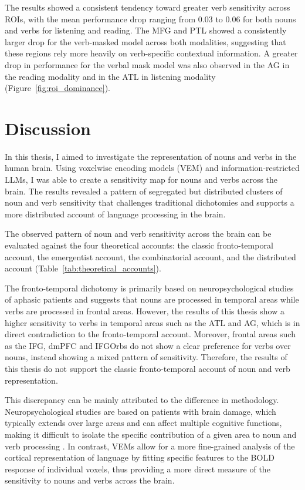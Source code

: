 \documentclass[a4paper]{article}
\begin{document}
The results showed a consistent tendency toward greater verb sensitivity across ROIs, with the mean performance drop ranging from 0.03 to 0.06 for both nouns and verbs for listening and reading. The MFG and PTL showed a consistently larger drop for the verb-masked model across both modalities, suggesting that these regions rely more heavily on verb-specific contextual information. A greater drop in performance for the verbal mask model was also observed in the AG in the reading modality and in the ATL in listening modality (Figure~\ref{fig:roi_dominance}).

\section*{Discussion} 
In this thesis, I aimed to investigate the representation of nouns and verbs in the human brain. Using voxelwise encoding models (VEM) and information-restricted LLMs, I was able to create a sensitivity map for nouns and verbs across the brain. The results revealed a pattern of segregated but distributed clusters of noun and verb sensitivity that challenges traditional dichotomies and supports a more distributed account of language processing in the brain.

The observed pattern of noun and verb sensitivity across the brain can be evaluated against the four theoretical accounts: the classic fronto-temporal account, the emergentist account, the combinatorial account, and the distributed account (Table~\ref{tab:theoretical_accounts}).

The fronto-temporal dichotomy is primarily based on neuropsychological studies of aphasic patients and suggests that nouns are processed in temporal areas while verbs are processed in frontal areas. However, the results of this thesis show a higher sensitivity to verbs in temporal areas such as the ATL and AG, which is in direct contradiction to the fronto-temporal account. Moreover, frontal areas such as the IFG, dmPFC and IFGOrbs do not show a clear preference for verbs over nouns, instead showing a mixed pattern of sensitivity. Therefore, the results of this thesis do not support the classic fronto-temporal account of noun and verb representation.

This discrepancy can be mainly attributed to the difference in methodology. Neuropsychological studies are based on patients with brain damage, which typically extends over large areas and can affect multiple cognitive functions, making it difficult to isolate the specific contribution of a given area to noun and verb processing \parencite{crepaldi_clustering_2013}. In contrast, VEMs allow for a more fine-grained analysis of the cortical representation of language by fitting specific features to the BOLD response of individual voxels, thus providing a more direct measure of the sensitivity to nouns and verbs across the brain.
\end{document}
